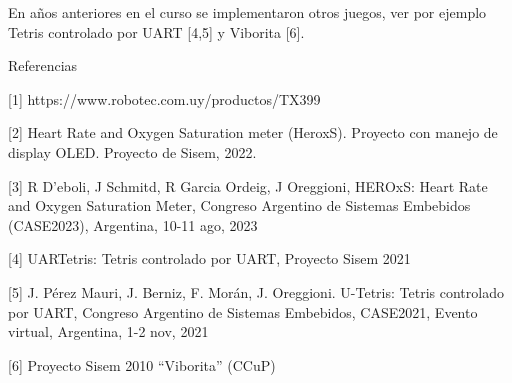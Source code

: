 \documentclass[a4paper,12pt]{article}
\begin{document}
\begin{linenumbers}
En años anteriores en el curso se implementaron otros juegos, ver por ejemplo Tetris controlado por UART [4,5] y Viborita [6].

Referencias 

[1] https://www.robotec.com.uy/productos/TX399 

[2] Heart Rate and Oxygen Saturation meter (HeroxS). Proyecto con manejo de display OLED. Proyecto de Sisem, 2022. 

[3] R D’eboli, J Schmitd, R Garcia Ordeig, J Oreggioni, HEROxS: Heart Rate and Oxygen Saturation Meter, Congreso Argentino de Sistemas Embebidos (CASE2023), Argentina, 10-11 ago, 2023 

[4] UARTetris: Tetris controlado por UART, Proyecto Sisem 2021 

[5] J. Pérez Mauri, J. Berniz, F. Morán, J. Oreggioni. U-Tetris: Tetris controlado por UART, Congreso Argentino de Sistemas Embebidos, CASE2021, Evento virtual, Argentina, 1-2 nov, 2021 

[6] Proyecto Sisem 2010 “Viborita” (CCuP)




\end{linenumbers}
\end{document}
